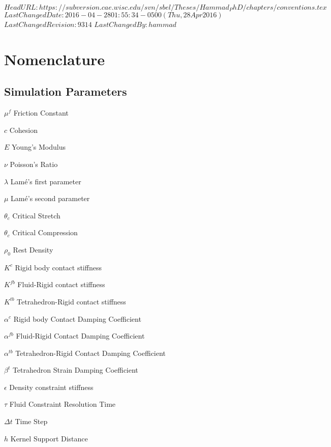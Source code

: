 \svnidlong
{$HeadURL: https://subversion.cae.wisc.edu/svn/sbel/Theses/Hammad_PhD/chapters/conventions.tex $}
{$LastChangedDate: 2016-04-28 01:55:34 -0500 (Thu, 28 Apr 2016) $}
{$LastChangedRevision: 9314 $}
{$LastChangedBy: hammad $}
\chapter{Nomenclature}
\label{chap:nomenclature}

\section*{Simulation Parameters}
\begin{multicols}{2}
\begin{compactdesc}
    \item[$\mu^f$] Friction Constant
    \item[$c$] Cohesion
    \item[$E$] Young's Modulus
    \item[$\nu$] Poisson's Ratio
    \item[$\lambda$] Lam\'{e}'s first parameter
    \item[$\mu$] Lam\'{e}'s second parameter
    \item[$\theta_c$] Critical Stretch
    \item[$\theta_c$] Critical Compression
    \item[$\rho_0$] Rest Density
    \item[$K^c$] Rigid body contact stiffness
    \item[$K^{fb}$] Fluid-Rigid contact stiffness
    \item[$K^{tb}$] Tetrahedron-Rigid contact stiffness
    \item[$\alpha^c$] Rigid body Contact Damping Coefficient
    \item[$\alpha^{fb}$] Fluid-Rigid Contact Damping Coefficient
    \item[$\alpha^{tb}$] Tetrahedron-Rigid Contact Damping Coefficient
    \item[$\beta^{t}$] Tetrahedron Strain Damping Coefficient
    \item[$\epsilon$] Density constraint stiffness
    \item[$\tau$] Fluid Constraint Resolution Time
    \item[$\Delta t$] Time Step
    \item[$h$] Kernel Support Distance
\end{compactdesc}
\end{multicols}

